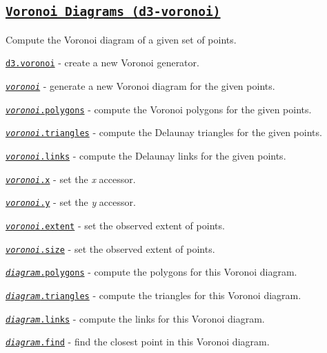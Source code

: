 \subsection*{\href{https://github.com/d3/d3-voronoi}{\tt Voronoi Diagrams (d3-\/voronoi)}}

Compute the Voronoi diagram of a given set of points.


\begin{DoxyItemize}
\item \href{https://github.com/d3/d3-voronoi/blob/master/README.md#voronoi}{\tt d3.\+voronoi} -\/ create a new Voronoi generator.
\item \href{https://github.com/d3/d3-voronoi/blob/master/README.md#_voronoi}{\tt {\itshape voronoi}} -\/ generate a new Voronoi diagram for the given points.
\item \href{https://github.com/d3/d3-voronoi/blob/master/README.md#voronoi_polygons}{\tt {\itshape voronoi}.polygons} -\/ compute the Voronoi polygons for the given points.
\item \href{https://github.com/d3/d3-voronoi/blob/master/README.md#voronoi_triangles}{\tt {\itshape voronoi}.triangles} -\/ compute the Delaunay triangles for the given points.
\item \href{https://github.com/d3/d3-voronoi/blob/master/README.md#voronoi_links}{\tt {\itshape voronoi}.links} -\/ compute the Delaunay links for the given points.
\item \href{https://github.com/d3/d3-voronoi/blob/master/README.md#voronoi_x}{\tt {\itshape voronoi}.x} -\/ set the {\itshape x} accessor.
\item \href{https://github.com/d3/d3-voronoi/blob/master/README.md#voronoi_y}{\tt {\itshape voronoi}.y} -\/ set the {\itshape y} accessor.
\item \href{https://github.com/d3/d3-voronoi/blob/master/README.md#voronoi_extent}{\tt {\itshape voronoi}.extent} -\/ set the observed extent of points.
\item \href{https://github.com/d3/d3-voronoi/blob/master/README.md#voronoi_size}{\tt {\itshape voronoi}.size} -\/ set the observed extent of points.
\item \href{https://github.com/d3/d3-voronoi/blob/master/README.md#diagram_polygons}{\tt {\itshape diagram}.polygons} -\/ compute the polygons for this Voronoi diagram.
\item \href{https://github.com/d3/d3-voronoi/blob/master/README.md#diagram_triangles}{\tt {\itshape diagram}.triangles} -\/ compute the triangles for this Voronoi diagram.
\item \href{https://github.com/d3/d3-voronoi/blob/master/README.md#diagram_links}{\tt {\itshape diagram}.links} -\/ compute the links for this Voronoi diagram.
\item \href{https://github.com/d3/d3-voronoi/blob/master/README.md#diagram_find}{\tt {\itshape diagram}.find} -\/ find the closest point in this Voronoi diagram.
\end{DoxyItemize}

